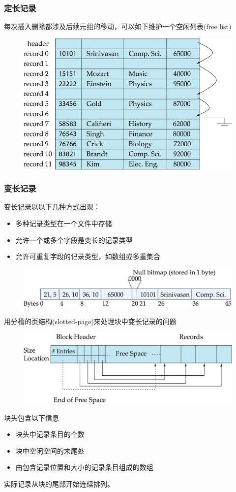 \subsubsection{定长记录}
每次插入删除都涉及后续元组的移动，可以如下维护一个空闲列表(free list)
\begin{figure}[H]
\centering
\includegraphics[width=0.6\linewidth]{fig/free_lists.png}
\end{figure}

\subsubsection{变长记录}
变长记录以以下几种方式出现：
\begin{itemize}
	\item 多种记录类型在一个文件中存储
	\item 允许一个或多个字段是变长的记录类型
	\item 允许可重复字段的记录类型，如数组或多重集合
\end{itemize}
\begin{figure}[H]
\centering
\includegraphics[width=0.5\linewidth]{fig/variable-length.png}
\end{figure}

用分槽的页结构(slotted-page)来处理块中变长记录的问题
\begin{figure}[H]
\centering
\includegraphics[width=0.5\linewidth]{fig/slotted_page.png}
\end{figure}

块头包含以下信息
\begin{itemize}
	\item 块头中记录条目的个数
	\item 块中空闲空间的末尾处
	\item 由包含记录位置和大小的记录条目组成的数组
\end{itemize}
实际记录从块的尾部开始连续排列。

